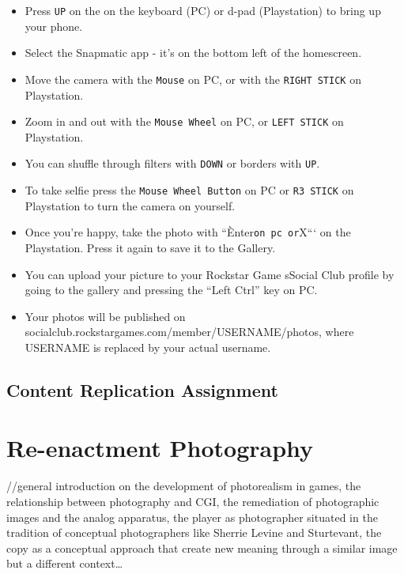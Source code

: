\documentclass[
  openany]{book}
\begin{document}
\begin{itemize}
\item
  Press \texttt{UP} on the on the keyboard (PC) or d-pad (Playstation) to bring up your phone.
\item
  Select the Snapmatic app - it's on the bottom left of the homescreen.
\item
  Move the camera with the \texttt{Mouse} on PC, or with the \texttt{RIGHT\ STICK} on Playstation.
\item
  Zoom in and out with the \texttt{Mouse\ Wheel} on PC, or \texttt{LEFT\ STICK} on Playstation.
\item
  You can shuffle through filters with \texttt{DOWN} or borders with \texttt{UP}.
\item
  To take selfie press the \texttt{Mouse\ Wheel\ Button} on PC or \texttt{R3\ STICK} on Playstation to turn the camera on yourself.
\item
  Once you're happy, take the photo with ``Ènter\texttt{on\ pc\ or}X``` on the Playstation. Press it again to save it to the Gallery.
\item
  You can upload your picture to your Rockstar Game sSocial Club profile by going to the gallery and pressing the ``Left Ctrl'' key on PC.
\item
  Your photos will be published on socialclub.rockstargames.com/member/USERNAME/photos, where USERNAME is replaced by your actual username.
\end{itemize}

\hypertarget{content-replication-assignment-1}{%
\section*{Content Replication Assignment}\label{content-replication-assignment-1}}

\hypertarget{re-enactment-photography}{%
\chapter{Re-enactment Photography}\label{re-enactment-photography}}

//general introduction on the development of photorealism in games, the relationship between photography and CGI, the remediation of photographic images and the analog apparatus, the player as photographer situated in the tradition of conceptual photographers like Sherrie Levine and Sturtevant, the copy as a conceptual approach that create new meaning through a similar image but a different context\ldots{}
\end{document}

